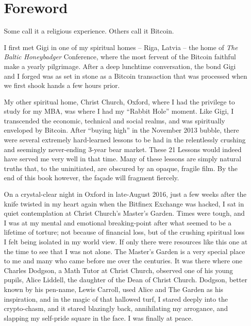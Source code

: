 \chapter*{Foreword}

Some call it a religious experience. Others call it Bitcoin.

I first met Gigi in one of my spiritual homes -- Riga, Latvia -- the home of
\textit{The Baltic Honeybadger} Conference, where the most fervent of the
Bitcoin faithful make a yearly pilgrimage. After a deep lunchtime conversation,
the bond Gigi and I forged was as set in stone as a Bitcoin transaction that was
processed when we first shook hands a few hours prior.

My other spiritual home, Christ Church, Oxford, where I had the privilege to
study for my MBA, was where I had my \enquote{Rabbit Hole} moment. Like Gigi, I
transcended the economic, technical and social realms, and was spiritually
enveloped by Bitcoin. After \enquote{buying high} in the November 2013 bubble,
there were several extremely hard-learned lessons to be had in the relentlessly
crushing and seemingly never-ending 3-year bear market. These 21 Lessons would
indeed have served me very well in that time. Many of these lessons are simply
natural truths that, to the uninitiated, are obscured by an opaque, fragile
film. By the end of this book however, the fa\c{c}ade will fragment fiercely.

On a crystal-clear night in Oxford in late-August 2016, just a few weeks after
the knife twisted in my heart again when the Bitfinex Exchange was hacked, I sat
in quiet contemplation at Christ Church’s Master’s Garden. Times were tough, and
I was at my mental and emotional breaking-point after what seemed to be a
lifetime of torture; not because of financial loss, but of the crushing
spiritual loss I felt being isolated in my world view. If only there were
resources like this one at the time to see that I was not alone. The Master’s
Garden is a very special place to me and many who came before me over the
centuries. It was there where one Charles Dodgson, a Math Tutor at Christ
Church, observed one of his young pupils, Alice Liddell, the daughter of the
Dean of Christ Church. Dodgson, better known by his pen-name, Lewis Carroll,
used Alice and The Garden as his inspiration, and in the magic of that hallowed
turf, I stared deeply into the crypto-chasm, and it stared blazingly back,
annihilating my arrogance, and slapping my self-pride square in the face. I was
finally at peace.

